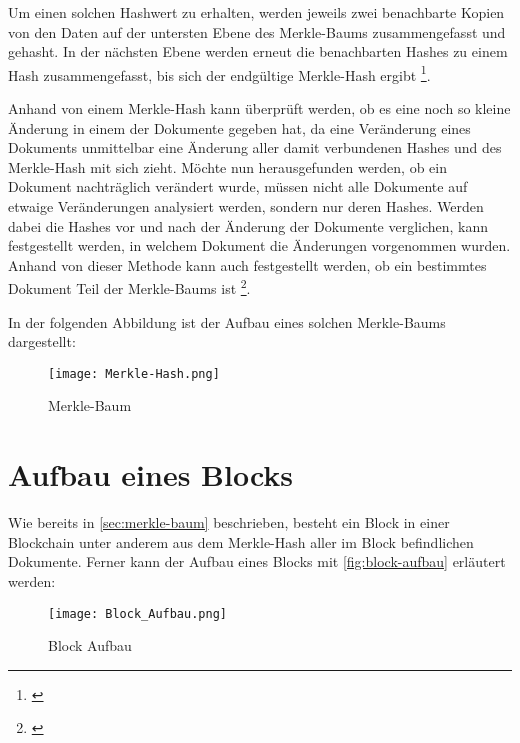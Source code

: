 Um einen solchen Hashwert zu erhalten, werden jeweils zwei benachbarte Kopien von den Daten auf der untersten Ebene des Merkle-Baums zusammengefasst und gehasht. In der nächsten Ebene werden erneut die benachbarten Hashes zu einem Hash zusammengefasst, bis sich der endgültige Merkle-Hash ergibt \footnote{\parencite[vgl.][S. 8f]{Fill.2020}}.

Anhand von einem Merkle-Hash kann überprüft werden, ob es eine noch so kleine Änderung in einem der Dokumente gegeben hat, da eine Veränderung eines Dokuments unmittelbar eine Änderung aller damit verbundenen Hashes und des Merkle-Hash mit sich zieht. Möchte nun herausgefunden werden, ob ein Dokument nachträglich verändert wurde, müssen nicht alle Dokumente auf etwaige Veränderungen analysiert werden, sondern nur deren Hashes. Werden dabei die Hashes vor und nach der Änderung der Dokumente verglichen, kann festgestellt werden, in welchem Dokument die Änderungen vorgenommen wurden. Anhand von dieser Methode kann auch festgestellt werden, ob ein bestimmtes Dokument Teil der Merkle-Baums ist \footnote{\parencite[vgl.][S. 9ff]{Fill.2020}}.

In der folgenden Abbildung ist der Aufbau eines solchen Merkle-Baums dargestellt:


\begin{figure}[h]
    \begin{centering}
        \texttt{[image: Merkle-Hash.png]}
        \caption[Merkle-Baum]{Merkle-Baum \footnotemark}
        \label{fig:Merkle-Baum}
    \end{centering}
\end{figure}


\section{Aufbau eines Blocks}\label{sec:aufbau-eines-blocks}
Wie bereits in \vref*{sec:merkle-baum} beschrieben, besteht ein Block in einer Blockchain unter anderem aus dem Merkle-Hash aller im Block befindlichen Dokumente. Ferner kann der Aufbau eines Blocks mit \vref{fig:block-aufbau} erläutert werden:


\begin{figure}[h]
    \begin{centering}
        \texttt{[image: Block\_Aufbau.png]}
        \caption[Block Aufbau]{Block Aufbau \footnotemark}
        \label{fig:block-aufbau}
    \end{centering}
\end{figure}

